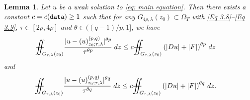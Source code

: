 \documentclass[11pt,oneside, english,reqno,twoside a4paper]{amsart}
\newtheorem{lemma}{Lemma}[section]
\theoremstyle{definition}
\numberwithin{theorem}{section}
\numberwithin{equation}{section}
\newcommand{\iintss}{{\int\hspace{-0.28cm}\int}}
\newcommand{ \miints }{{\iintss\hspace{-0.56cm} -\hspace{-0.15cm}-}}
\newcommand{\miint}[1]{{\miints_{\hspace{-0.13cm}#1}}}
\begin{document}
\begin{lemma}\label{Lemma 3.13}
Let $u$ be a weak solution to \eqref{eq: main equation}. Then there exists a constant $c=c(\textnormal{\texttt{data}}) \geq 1$ such that for any $G_{4\rho,\lambda}(z_0)\subset \Omega_T$ with \eqref{Eq 3.8}--\eqref{Eq 3.9}, $\tau \in [2\rho,4\rho]$ and $\theta \in ((q-1)/p,1]$, we have
\begin{align}\label{Eq 3.10}
&\miint{G_{\tau,\lambda}(z_0)} \frac{|u-(u)^{(p,q)}_{z_0;\tau,\lambda}|^{\theta p}}{\tau^{\theta p}}\; dz \leq c \miint{G_{\tau,\lambda}(z_0)} \left(|Du|+|F|\right)^{\theta p}\, dz
\end{align}
and 
\begin{align}\label{Eq: 3.11}
&\miint{G_{\tau,\lambda}(z_0)} \frac{|u-(u)^{(p,q)}_{z_0;\tau,\lambda}|^{\theta q}}{\tau^{\theta q}}\; dz \leq c \miint{G_{\tau,\lambda}(z_0)} \left(|Du|+|F|\right)^{\theta q}\, dz.
\end{align}
\end{lemma}
\end{document}
